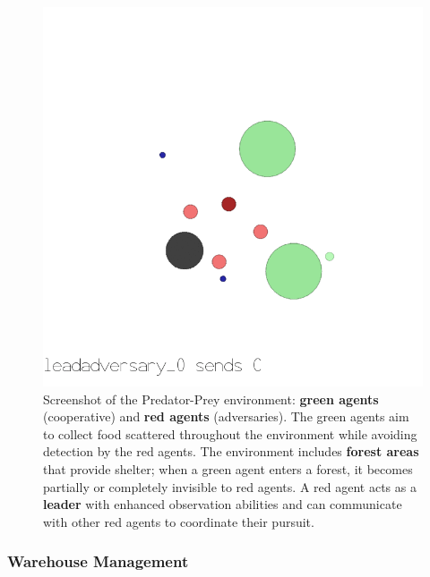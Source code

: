 \begin{figure}[h!]
  \centering
  \includegraphics[trim=0cm 4.5cm 0cm 1cm, clip,width=0.9\linewidth]{figures/predator_prey.png}
  \caption[Screenshot of the Predator-Prey environment]{Screenshot of the Predator-Prey environment: \textbf{green agents} (cooperative) and \textbf{red agents} (adversaries). The green agents aim to collect food scattered throughout the environment while avoiding detection by the red agents. The environment includes \textbf{forest areas} that provide shelter; when a green agent enters a forest, it becomes partially or completely invisible to red agents. A red agent acts as a \textbf{leader} with enhanced observation abilities and can communicate with other red agents to coordinate their pursuit.}
  \label{fig:predator_prey}
\end{figure}

\subsubsection*{Warehouse Management}

